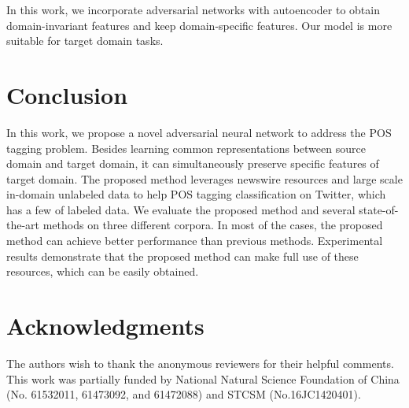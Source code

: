 \documentclass[11pt,letterpaper]{article}
\begin{document}
In this work, we incorporate adversarial networks with autoencoder to obtain domain-invariant features and keep domain-specific features. Our model is more suitable for target domain tasks.


\section{Conclusion}
In this work, we propose a novel adversarial neural network to address the POS tagging problem. Besides learning common representations between source domain and target domain, it can simultaneously preserve specific features of target domain. The proposed method leverages newswire resources and large scale in-domain unlabeled data to help POS tagging classification on Twitter, which has a few of labeled data. We evaluate the proposed method and several state-of-the-art methods on three different corpora. In most of the cases, the proposed method can achieve better performance than previous methods. Experimental results demonstrate that the proposed method can make full use of these resources, which can be easily obtained. 

\section*{Acknowledgments}
The authors wish to thank the anonymous reviewers for their helpful comments. This work was partially funded by National Natural Science Foundation of China (No. 61532011, 61473092, and 61472088) and STCSM (No.16JC1420401).



\end{document}

